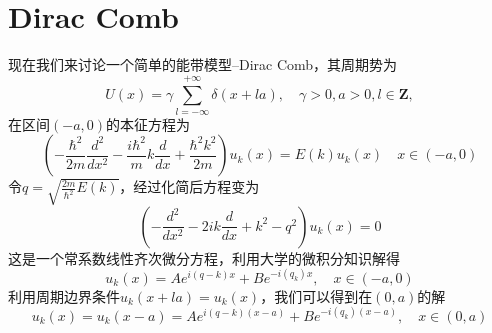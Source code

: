 \section{Dirac Comb}
现在我们来讨论一个简单的能带模型--Dirac Comb，其周期势为
\begin{equation}
    U(x) = \gamma \sum_{l = -\infty}^{+\infty}\delta(x + la), \quad \gamma >0,a>0,l\in \mathbf{Z},
\end{equation}
在区间$(-a,0)$的本征方程为
\begin{equation}
(-\frac{\hbar^2}{2m} \frac{d^2}{dx^2} - \frac{i\hbar^2}{m}k \frac{d}{dx} + \frac{\hbar^2k^2}{2m}) u_k(x) = E(k)u_k(x) \quad x\in (-a,0)
\end{equation}
令$q = \sqrt{\frac{2m}{\hbar^2}E(k)}$，经过化简后方程变为
\begin{equation}
    (-\frac{d^2}{dx^2} - 2ik\frac{d}{dx} + k^2 - q^2)u_k(x) = 0
\end{equation}
这是一个常系数线性齐次微分方程，利用大学的微积分知识解得
\begin{equation}
    u_k(x) = Ae^{i(q-k)x} + Be^{-i(q_k)x}, \quad x\in (-a,0)
\end{equation}
利用周期边界条件$u_k(x+la) = u_k(x)$，我们可以得到在$(0,a)$的解
\begin{equation}
    u_k(x) = u_k(x-a) = Ae^{i(q-k)(x-a)} + Be^{-i(q_k)(x-a)}, \quad x\in (0,a)
\end{equation}

